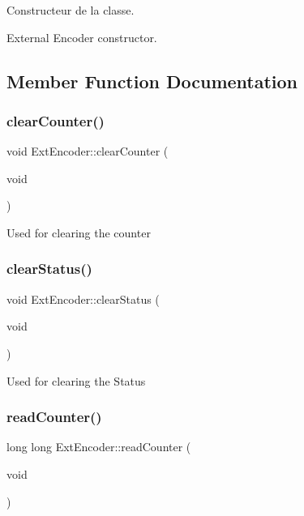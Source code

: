 Constructeur de la classe. 

External Encoder constructor. 

\subsection{Member Function Documentation}
\mbox{\label{classExtEncoder_a187873c6764201d81e390898561453b0}} 
\subsubsection{\texorpdfstring{clear\+Counter()}{clearCounter()}}
{\footnotesize\ttfamily void Ext\+Encoder\+::clear\+Counter (\begin{DoxyParamCaption}\item[{void}]{ }\end{DoxyParamCaption})}

Used for clearing the counter \mbox{\label{classExtEncoder_a29f9713ba37b80c683e65f07f3d1d122}} 
\subsubsection{\texorpdfstring{clear\+Status()}{clearStatus()}}
{\footnotesize\ttfamily void Ext\+Encoder\+::clear\+Status (\begin{DoxyParamCaption}\item[{void}]{ }\end{DoxyParamCaption})}

Used for clearing the Status \mbox{\label{classExtEncoder_a3ae8c304bba659d47395ba10187bb922}} 
\subsubsection{\texorpdfstring{read\+Counter()}{readCounter()}}
{\footnotesize\ttfamily long long Ext\+Encoder\+::read\+Counter (\begin{DoxyParamCaption}\item[{void}]{ }\end{DoxyParamCaption})}

